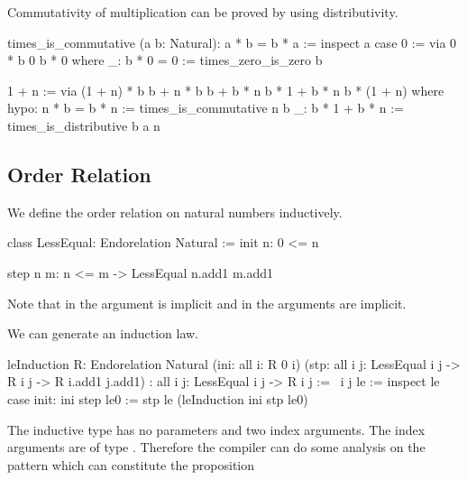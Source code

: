 Commutativity of multiplication can be proved by using distributivity.

\begin{alba}
  times_is_commutative (a b: Natural): a * b = b * a :=
    inspect a case
      0 :=
       via 0 * b
           0
           b * 0
       where
         _: b * 0 = 0 := times_zero_is_zero b

      1 + n :=
        via
          (1 + n) * b
          b + n * b
          b + b * n
          b * 1 + b * n
          b * (1 + n)
        where
          hypo: n * b = b * n := times_is_commutative n b
          _: b * 1 + b * n := times_is_distributive b a n
\end{alba}









\subsection{Order Relation}

We define the order relation on natural numbers inductively.

\begin{alba}
    class
        LessEqual: Endorelation Natural
    :=
        init {n}:
            0 <= n

        step {n m}:
            n <= m
            -> LessEqual n.add1 m.add1
\end{alba}
%
Note that in  the argument  is implicit and in  the arguments  are implicit.

We can generate an induction law.
\begin{alba}
    leInduction
        {R: Endorelation Natural}
        (ini: all {i}: R 0 i)
        (stp: all {i j}: LessEqual i j -> R i j -> R i.add1 j.add1)
        : all {i j}: LessEqual i j -> R i j
    :=
        \ {i j} le :=
            inspect le case
                init: ini
                step le0 := stp le (leInduction ini stp le0)
\end{alba}

The inductive type has no parameters and two index arguments. The index
arguments are of type . Therefore the compiler can do some analysis
on the pattern which can constitute the proposition 

